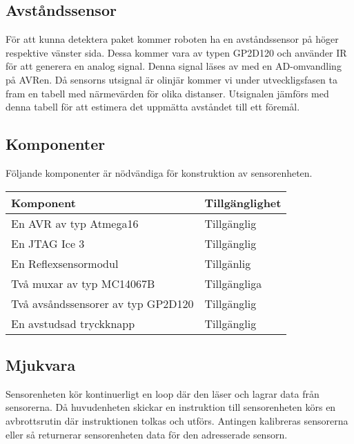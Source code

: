 \subsection{Avståndssensor}
För att kunna detektera paket kommer roboten ha en avståndssensor på höger respektive vänster sida. Dessa kommer vara av typen GP2D120 och använder IR för att generera en analog signal. Denna signal läses av med en AD-omvandling på AVRen. Då sensorns utsignal är olinjär kommer vi under utveckligsfasen ta fram en tabell med närmevärden för olika distanser. Utsignalen jämförs med denna tabell för att estimera det uppmätta avståndet till ett föremål.

\subsection{Komponenter}
Följande komponenter är nödvändiga för konstruktion av sensorenheten. \\

\begin{tabularx}{\textwidth}{| l | X |}
	\hline
	{\textbf{Komponent}} & {\textbf{Tillgänglighet}} \\\hline
	{En AVR av typ Atmega16} & {Tillgänglig} \\\hline
	{En JTAG Ice 3} & {Tillgänglig} \\\hline
	{En Reflexsensormodul} & {Tillgänlig} \\\hline
	{Två muxar av typ MC14067B} & {Tillgängliga} \\\hline
	{Två avsåndssensorer av typ GP2D120} & {Tillgänglig} \\\hline
	{En avstudsad tryckknapp} & {Tillgänglig} \\\hline
\end{tabularx}

\subsection{Mjukvara}
Sensorenheten kör kontinuerligt en loop där den läser och lagrar data från sensorerna. Då huvudenheten skickar en instruktion till sensorenheten körs en avbrottsrutin där instruktionen tolkas och utförs. Antingen kalibreras sensorerna eller så returnerar sensorenheten data för den adresserade sensorn.




%
